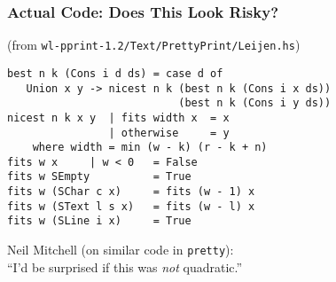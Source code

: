 \begin{frame}[fragile]
\frametitle{Actual Code: Does This Look Risky?}
\begin{small}
(from \texttt{wl-pprint-1.2/Text/PrettyPrint/Leijen.hs})
\begin{verbatim}
best n k (Cons i d ds) = case d of 
   Union x y -> nicest n k (best n k (Cons i x ds))
                           (best n k (Cons i y ds))
nicest n k x y  | fits width x  = x
                | otherwise     = y
    where width = min (w - k) (r - k + n)
fits w x     | w < 0   = False
fits w SEmpty          = True
fits w (SChar c x)     = fits (w - 1) x
fits w (SText l s x)   = fits (w - l) x
fits w (SLine i x)     = True
\end{verbatim}
\end{small}
Neil Mitchell (on similar code in \texttt{pretty}):\\
``I'd be surprised if this was \emph{not} quadratic.''
\end{frame}
